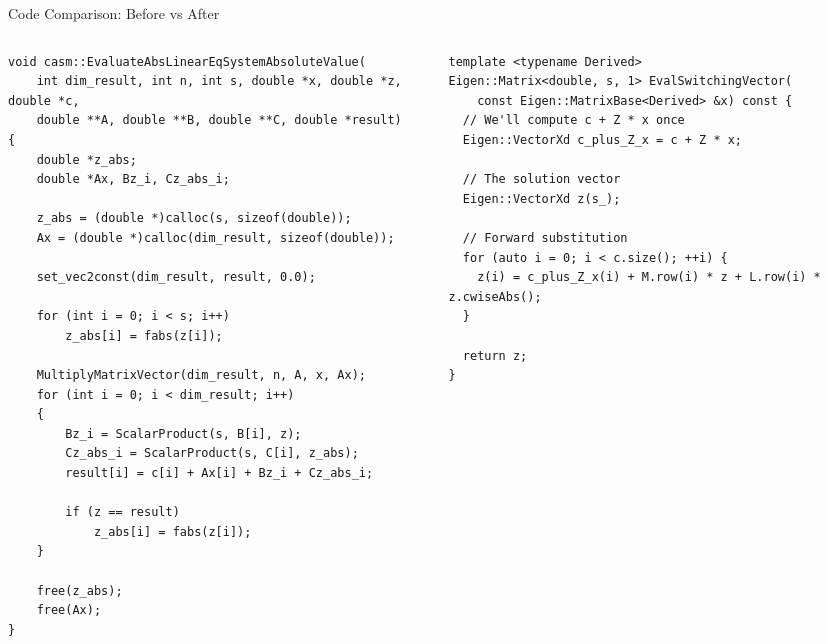 \documentclass[aspectratio=169]{beamer}
\begin{document}
\begin{frame}[fragile]{Code Comparison: Before vs After}
    \begin{columns}[T]
        \begin{column}{0.48\textwidth}
            \begin{block}{}
                \tiny
                \begin{verbatim}
void casm::EvaluateAbsLinearEqSystemAbsoluteValue(
    int dim_result, int n, int s, double *x, double *z, double *c,
    double **A, double **B, double **C, double *result)
{
    double *z_abs;
    double *Ax, Bz_i, Cz_abs_i;

    z_abs = (double *)calloc(s, sizeof(double));
    Ax = (double *)calloc(dim_result, sizeof(double));

    set_vec2const(dim_result, result, 0.0);

    for (int i = 0; i < s; i++)
        z_abs[i] = fabs(z[i]);

    MultiplyMatrixVector(dim_result, n, A, x, Ax);
    for (int i = 0; i < dim_result; i++)
    {
        Bz_i = ScalarProduct(s, B[i], z);
        Cz_abs_i = ScalarProduct(s, C[i], z_abs);
        result[i] = c[i] + Ax[i] + Bz_i + Cz_abs_i;

        if (z == result)
            z_abs[i] = fabs(z[i]);
    }

    free(z_abs);
    free(Ax);
}
                \end{verbatim}
            \end{block}
        \end{column}

        \begin{column}{0.48\textwidth}
            \begin{block}{}
                \tiny
                \begin{verbatim}
template <typename Derived>
Eigen::Matrix<double, s, 1> EvalSwitchingVector(
    const Eigen::MatrixBase<Derived> &x) const {
  // We'll compute c + Z * x once
  Eigen::VectorXd c_plus_Z_x = c + Z * x;

  // The solution vector
  Eigen::VectorXd z(s_);

  // Forward substitution
  for (auto i = 0; i < c.size(); ++i) {
    z(i) = c_plus_Z_x(i) + M.row(i) * z + L.row(i) * z.cwiseAbs();
  }

  return z;
}
                \end{verbatim}
            \end{block}
        \end{column}
    \end{columns}
\end{frame}
\end{document}
